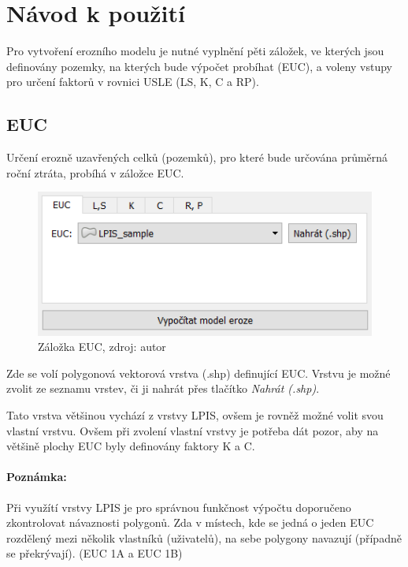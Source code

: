 \section{Návod k použití}
\label{navod_k_pouziti}
Pro vytvoření erozního modelu je nutné vyplnění pěti záložek, ve kterých jsou definovány pozemky, na kterých bude výpočet probíhat (EUC), a voleny vstupy pro určení faktorů v rovnici USLE (LS, K, C a RP).
\subsection{EUC}
Určení erozně uzavřených celků (pozemků), pro které bude určována průměrná roční ztráta, probíhá v záložce EUC.

	\begin{figure}[H] \centering
		\includegraphics[width=.5\textwidth]{./pictures/euc.png}
		\caption[Záložka EUC]{Záložka EUC, zdroj: autor}
		\label{zalozka_euc}
 	\end{figure}

Zde se volí polygonová vektorová vrstva (.shp) definující EUC. Vrstvu je možné zvolit ze seznamu vrstev, či ji nahrát přes tlačítko \textit{Nahrát (.shp)}.

Tato vrstva většinou vychází z vrstvy LPIS, ovšem je rovněž možné volit svou vlastní vrstvu. Ovšem při zvolení vlastní vrstvy je potřeba dát pozor, aby na většině plochy EUC byly definovány faktory K a C.

\paragraph{Poznámka:}
Při využítí vrstvy LPIS je pro správnou funkčnost výpočtu doporučeno zkontrolovat návaznosti polygonů. Zda v místech, kde se jedná o jeden EUC rozdělený mezi několik vlastníků (uživatelů), na sebe polygony navazují (případně se překrývají). (EUC 1A a EUC 1B)

